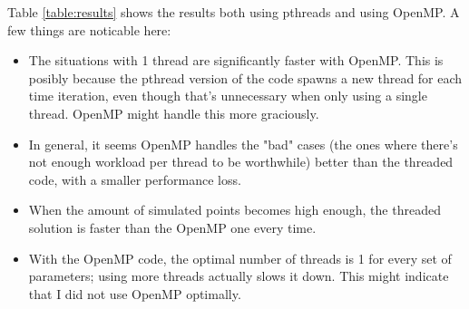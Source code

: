\documentclass[a4paper]{article}
\begin{document}
Table \ref{table:results} shows the results both using pthreads and using
OpenMP. A few things are noticable here:
\begin{itemize}
    \item The situations with 1 thread are significantly faster with OpenMP.
          This is posibly because the pthread version of the code spawns a new thread
          for each time iteration, even though that's unnecessary when only using a
          single thread. OpenMP might handle this more graciously.
    \item In general, it seems OpenMP handles the "bad" cases (the ones where
          there's not enough workload per thread to be worthwhile) better than the
          threaded code, with a smaller performance loss.
    \item When the amount of simulated points becomes high enough, the threaded
          solution is faster than the OpenMP one every time.
    \item With the OpenMP code, the optimal number of threads is 1 for every set
          of parameters; using more threads actually slows it down. This might indicate
          that I did not use OpenMP optimally.
\end{itemize}
\end{document}
